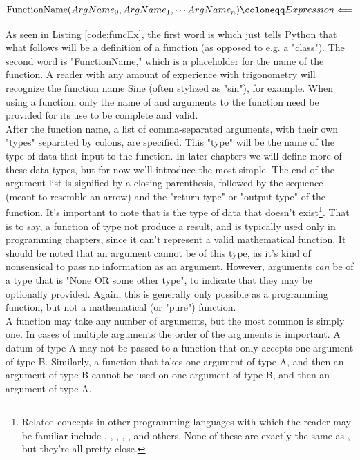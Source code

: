 \begin{equation}\label{func:funcname}
\textnormal{FunctionName}(ArgName_0, ArgName_1, \cdots ArgName_n) \coloneqq Expression \Longleftarrow
\end{equation}

As seen in Listing \ref{code:funcEx}, the first word is  which just tells Python that what follows will be a definition of a function (as opposed to e.g. a "class"). The second word is "FunctionName," which is a placeholder for the name of the function. A reader with any amount of experience with trigonometry will recognize the function name Sine (often stylized as "sin"), for example. When using a function, only the name of and arguments to the function need be provided for its use to be complete and valid. \\
After the function name, a list of comma-separated arguments, with their own "types" separated by colons, are specified. This "type" will be the name of the type of data that input to the function. In later chapters we will define more of these data-types, but for now we'll introduce the most simple. The end of the argument list is signified by a closing parenthesis, followed by the sequence \code{->} (meant to resemble an arrow) and the "return type" or "output type" of the function. It's important to note that  is the type of data that doesn't exist\footnote{Related concepts in other programming languages with which the reader may be familiar include , , , , , and others. None of these are exactly the same as , but they're all pretty close.}. That is to say, a function of type  not produce a result, and is typically used only in programming chapters, since it can't represent a valid mathematical function.
It should be noted that an argument cannot be of this type, as it's kind of nonsensical to pass no information as an argument. However, arguments \emph{can} be of a type that is "None OR some other type", to indicate that they may be optionally provided. Again, this is generally only possible as a programming function, but not a mathematical (or "pure") function.\\
A function may take any number of arguments, but the most common is simply one. In cases of multiple arguments the order of the arguments is important. A datum of type A may not be passed to a function that only accepts one argument of type B. Similarly, a function that takes one argument of type A, and then an argument of type B cannot be used on one argument of type B, and then an argument of type A. \\
